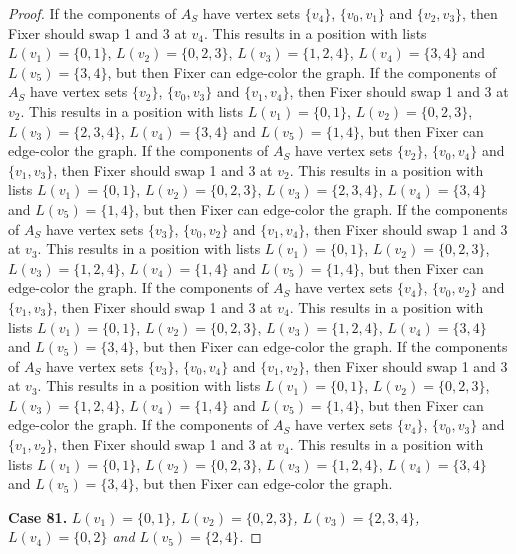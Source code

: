 \documentclass[12pt]{amsart}
\theoremstyle{plain}
\theoremstyle{definition}
\theoremstyle{remark}
\begin{document}
\begin{proof}
If the components of $A_S$ have vertex sets $\{v_4\}$, $\{v_0, v_1\}$ and $\{v_2, v_3\}$, then Fixer should swap 1 and 3 at $v_4$. This results in a position with lists $L(v_1) = \{0, 1\}$, $L(v_2) = \{0, 2, 3\}$, $L(v_3) = \{1, 2, 4\}$, $L(v_4) = \{3, 4\}$ and $L(v_5) = \{3, 4\}$, but then Fixer can edge-color the graph.
If the components of $A_S$ have vertex sets $\{v_2\}$, $\{v_0, v_3\}$ and $\{v_1, v_4\}$, then Fixer should swap 1 and 3 at $v_2$. This results in a position with lists $L(v_1) = \{0, 1\}$, $L(v_2) = \{0, 2, 3\}$, $L(v_3) = \{2, 3, 4\}$, $L(v_4) = \{3, 4\}$ and $L(v_5) = \{1, 4\}$, but then Fixer can edge-color the graph.
If the components of $A_S$ have vertex sets $\{v_2\}$, $\{v_0, v_4\}$ and $\{v_1, v_3\}$, then Fixer should swap 1 and 3 at $v_2$. This results in a position with lists $L(v_1) = \{0, 1\}$, $L(v_2) = \{0, 2, 3\}$, $L(v_3) = \{2, 3, 4\}$, $L(v_4) = \{3, 4\}$ and $L(v_5) = \{1, 4\}$, but then Fixer can edge-color the graph.
If the components of $A_S$ have vertex sets $\{v_3\}$, $\{v_0, v_2\}$ and $\{v_1, v_4\}$, then Fixer should swap 1 and 3 at $v_3$. This results in a position with lists $L(v_1) = \{0, 1\}$, $L(v_2) = \{0, 2, 3\}$, $L(v_3) = \{1, 2, 4\}$, $L(v_4) = \{1, 4\}$ and $L(v_5) = \{1, 4\}$, but then Fixer can edge-color the graph.
If the components of $A_S$ have vertex sets $\{v_4\}$, $\{v_0, v_2\}$ and $\{v_1, v_3\}$, then Fixer should swap 1 and 3 at $v_4$. This results in a position with lists $L(v_1) = \{0, 1\}$, $L(v_2) = \{0, 2, 3\}$, $L(v_3) = \{1, 2, 4\}$, $L(v_4) = \{3, 4\}$ and $L(v_5) = \{3, 4\}$, but then Fixer can edge-color the graph.
If the components of $A_S$ have vertex sets $\{v_3\}$, $\{v_0, v_4\}$ and $\{v_1, v_2\}$, then Fixer should swap 1 and 3 at $v_3$. This results in a position with lists $L(v_1) = \{0, 1\}$, $L(v_2) = \{0, 2, 3\}$, $L(v_3) = \{1, 2, 4\}$, $L(v_4) = \{1, 4\}$ and $L(v_5) = \{1, 4\}$, but then Fixer can edge-color the graph.
If the components of $A_S$ have vertex sets $\{v_4\}$, $\{v_0, v_3\}$ and $\{v_1, v_2\}$, then Fixer should swap 1 and 3 at $v_4$. This results in a position with lists $L(v_1) = \{0, 1\}$, $L(v_2) = \{0, 2, 3\}$, $L(v_3) = \{1, 2, 4\}$, $L(v_4) = \{3, 4\}$ and $L(v_5) = \{3, 4\}$, but then Fixer can edge-color the graph.

\noindent\textbf{Case 81.  }\textit{$L(v_1) = \{0, 1\}$, $L(v_2) = \{0, 2, 3\}$, $L(v_3) = \{2, 3, 4\}$, $L(v_4) = \{0, 2\}$ and $L(v_5) = \{2, 4\}$.}


\end{proof}
\end{document}
